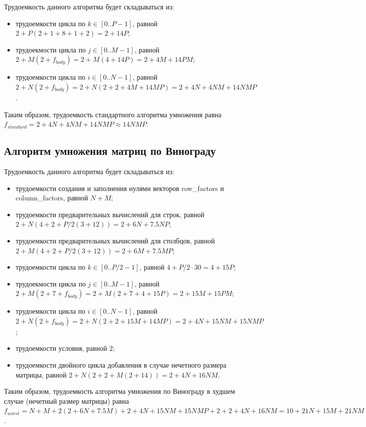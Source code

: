 Трудоемкость данного алгоритма будет складываться из:

\begin{itemize}
	\item трудоемкости цикла по $k \in [0..P-1]$, равной $2 + P(2 + 1 + 8 + 1 + 2) = 2 + 14P$;
	\item трудоекмости цикла по $j \in [0..M-1]$, равной $2 + M(2 + f_{body}) = 2 + M(4 + 14P) = 2 + 4M + 14PM$;
	\item трудоемкости цикла по $i \in [0..N-1]$, равной $2 + N(2 + f_{body}) = 2 + N(2 + 2 + 4M + 14MP) = 2 + 4N + 4NM + 14NMP$.
\end{itemize}

Таким образом, трудоемкость стандартного алгоритма умножения равна $f_{standard} = 2 + 4N + 4NM + 14NMP \approx 14NMP$.

\subsection{Алгоритм умножения матриц по Винограду}

Трудоемкость данного алгоритма будет складываться из:

\begin{itemize}
	\item трудоемкости создания и заполнения нулями векторов row\_factors и column\_factors, равной $N + M$;
	\item трудоемкости предварительных вычислений для строк, равной $2 + N(4 + 2 + P/2(3 + 12)) = 2 + 6N + 7.5NP$;
	\item трудоемкости предварительных вычислений для столбцов, равной $2 + M(4 + 2 + P/2(3 + 12)) = 2 + 6M + 7.5MP$;
	\item трудоемкости цикла по $k \in [0..P/2-1]$, равной $4 + P/2 \cdot 30 = 4 + 15P$;
	\item трудоекмости цикла по $j \in [0..M-1]$, равной $2 + M(2 + 7 + f_{body}) = 2 + M(2 + 7 + 4 + 15P) = 2 + 15M + 15PM$;
	\item трудоемкости цикла по $i \in [0..N-1]$, равной $2 + N(2 + f_{body}) = 2 + N(2 + 2 + 15M + 14MP) = 2 + 4N + 15NM + 15NMP$;
	\item трудоемкости условия, равной $2$;
	\item трудоемкости двойного цикла добавления в случае нечетного размера матрицы, равной $2 + N(2 + 2 + M(2 + 14)) = 2 + 4N + 16NM$.
\end{itemize}

Таким образом, трудоемкость алгоритма умножения по Винограду в худшем случае (нечетный размер матрицы) равна $f_{worst} = N + M + 2(2 + 6N + 7.5M) + 2 + 4N + 15NM + 15NMP + 2 + 2 + 4N + 16NM = 10 + 21N + 15M + 21NM + 15NMP \approx 15NMP$.

